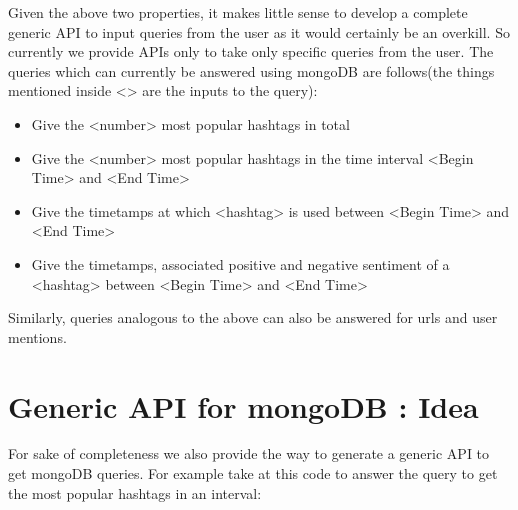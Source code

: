 \documentclass[letterpaper,10pt,english]{sphinxmanual}
\begin{document}
Given the above two properties, it makes little sense to develop a complete generic API to input queries from the user as it would certainly be an overkill. So currently we provide APIs only to take only specific queries from the user. The queries which can currently be answered using mongoDB are follows(the things mentioned inside \textless{}\textgreater{} are the inputs to the query):
\begin{itemize}
\item {} 
Give the \textless{}number\textgreater{} most popular hashtags in total

\item {} 
Give the \textless{}number\textgreater{} most popular hashtags in the time interval \textless{}Begin Time\textgreater{} and \textless{}End Time\textgreater{}

\item {} 
Give the timetamps at which \textless{}hashtag\textgreater{} is used between \textless{}Begin Time\textgreater{} and \textless{}End Time\textgreater{}

\item {} 
Give the timetamps, associated positive and negative sentiment of a \textless{}hashtag\textgreater{} between \textless{}Begin Time\textgreater{} and \textless{}End Time\textgreater{}

\end{itemize}

Similarly, queries analogous to the above can also be answered for urls and user mentions.


\section{Generic API for mongoDB : Idea}
\label{\detokenize{mongoDB_query_generation:generic-api-for-mongodb-idea}}
For sake of completeness we also provide the way to generate a generic API to get mongoDB queries. For example take at this code to answer the query to get the most popular hashtags in an interval:
\end{document}
